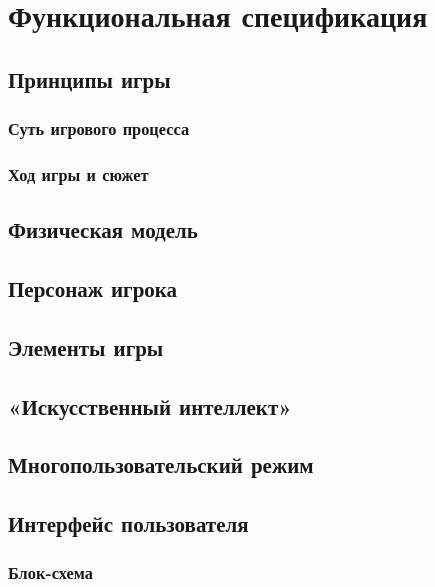 \documentclass{article}
\begin{document}
	\newpage
	\section{Функциональная спецификация}
	
	\subsection{Принципы игры}
	
	\subsubsection{Суть игрового процесса}
	
	\subsubsection{Ход игры и сюжет}
	
	\newpage
	\subsection{Физическая модель}
	
	\newpage
	\subsection{Персонаж игрока}
	
	\newpage
	\subsection{Элементы игры}
	
	\newpage
	\subsection{«Искусственный интеллект»}
	
	\newpage
	\subsection{Многопользовательский режим}
	
	\newpage
	\subsection{Интерфейс пользователя}
	
	\subsubsection{Блок-схема}
	
\end{document}
